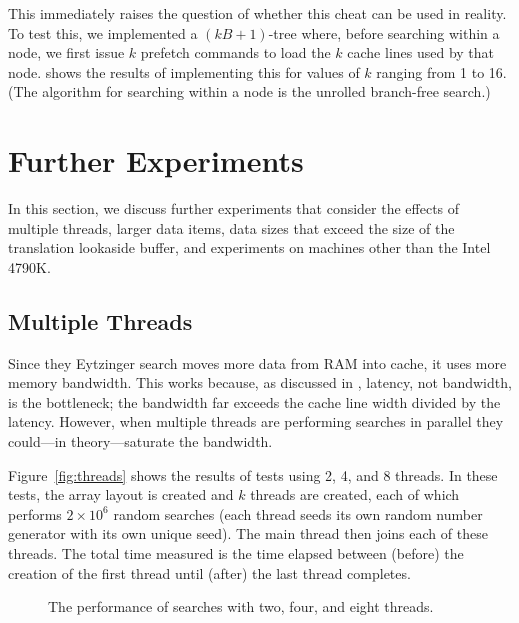 \documentclass{patmorin}
\begin{document}
This immediately raises the question of whether this cheat can be used
in reality.  To test this, we implemented a $(kB+1)$-tree where, before
searching within a node, we first issue $k$ prefetch commands to load the
$k$ cache lines used by that node.   shows the results of
implementing this for values of $k$ ranging from 1 to 16. (The algorithm
for searching within a node is the unrolled branch-free search.)








\section{Further Experiments}

In this section, we discuss further experiments that consider the effects
of multiple threads, larger data items, data sizes that exceed the size
of the translation lookaside buffer, and experiments on machines other
than the Intel 4790K.

\subsection{Multiple Threads}

Since they Eytzinger search moves more data from RAM into cache,
it uses more memory bandwidth.  This works because, as discussed in
, latency, not bandwidth, is the bottleneck; the
bandwidth far exceeds the cache line width divided by the latency.
However, when multiple threads are performing searches in parallel they
could---in theory---saturate the bandwidth.

Figure~\ref{fig:threads} shows the results of tests
using 2, 4, and 8 threads.  In these tests, the array layout is created
and $k$ threads are created, each of which performs $2\times 10^6$
random searches (each thread seeds its own random number generator
with its own unique seed).  The main thread then joins each of these
threads. The total time measured is the time elapsed between (before)
the creation of the first thread until (after) the last thread completes.

\begin{figure}
   \caption{The performance of searches with two, four, and eight threads.}
\end{figure}
\end{document}
